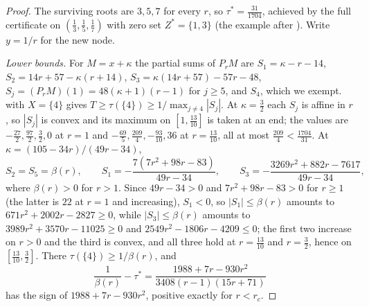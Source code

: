 \documentclass[11pt]{article}
\begin{document}
\begin{proof}
The surviving roots are $3,5,7$ for every $r$, so $\tau^*=\tfrac{31}{1704}$,
achieved by the full certificate on $(\tfrac13,\tfrac15,\tfrac17)$ with zero
set $Z^*=\{1,3\}$ (the example after \cite[Theorem~4.3]{coefficient-mass-attainment}).  Write
$y=1/r$ for the new node.

\emph{Lower bounds.}  For $M=x+\kappa$ the partial sums of $P_rM$ are
$S_1=\kappa-r-14$, $S_2=14r+57-\kappa(r+14)$, $S_3=\kappa(14r+57)-57r-48$,
$S_j=(P_rM)(1)=48(\kappa+1)(r-1)$ for $j\ge5$, and $S_4$, which we exempt.
\cite[Lemma~5.1]{coefficient-mass-attainment} with $X=\{4\}$ gives
$T\ge\tau(\{4\})\ge1/\max_{j\ne4}|S_j|$.  At $\kappa=\tfrac32$ each $S_j$ is
affine in $r$, so $|S_j|$ is convex and its maximum on $[1,\tfrac{13}{10}]$
is taken at an end; the values are $-\tfrac{27}2,\tfrac{97}2,\tfrac32,0$ at
$r=1$ and $-\tfrac{69}5,\tfrac{209}4,-\tfrac{93}{10},36$ at
$r=\tfrac{13}{10}$, all at most $\tfrac{209}4<\tfrac{1704}{31}$.  At
$\kappa=(105-34r)/(49r-34)$,
\[
  S_2=S_5=\beta(r),\qquad
  S_1=-\frac{7(7r^2+98r-83)}{49r-34},\qquad
  S_3=-\frac{3269r^2+882r-7617}{49r-34},
\]
where $\beta(r)>0$ for $r>1$.  Since $49r-34>0$ and $7r^2+98r-83>0$ for $r\ge1$ (the
latter is $22$ at $r=1$ and increasing), $S_1<0$, so $|S_1|\le\beta(r)$
amounts to $671r^2+2002r-2827\ge0$, while $|S_3|\le\beta(r)$ amounts to
$3989r^2+3570r-11025\ge0$ and $2549r^2-1806r-4209\le0$; the first two
increase on $r>0$ and the third is convex, and all three hold at
$r=\tfrac{13}{10}$ and $r=\tfrac32$, hence on $[\tfrac{13}{10},\tfrac32]$.
There $\tau(\{4\})\ge1/\beta(r)$, and
\[
  \frac1{\beta(r)}-\tau^*=\frac{1988+7r-930r^2}{3408(r-1)(15r+71)}
\]
has the sign of $1988+7r-930r^2$, positive exactly for $r<r_c$.


\end{proof}
\end{document}
